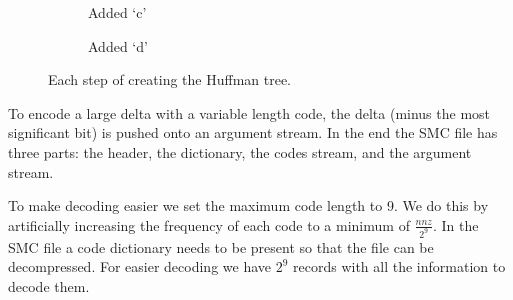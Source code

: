 \begin{figure}
\begin{subfigure}{.5\linewidth}
\begin{tikzpicture}
        \end{tikzpicture}
        \caption{Added `c'}
        \label{fig:Huffmantree3}
    \end{subfigure}
    \begin{subfigure}{.45\linewidth}
        \centering
        \caption{Added `d'}
        \label{fig:Huffmantree3}
    \end{subfigure}
    \caption[Huffman tree for sparse matrix compression.]{Each step of creating the Huffman tree.}
    \label{fig:huffman_tree}
\end{figure}

To encode a large delta with a variable length code, the delta (minus the most significant bit) is pushed onto an argument stream. In the end the SMC file has three parts: the header, the dictionary, the codes stream, and the argument stream.

To make decoding easier we set the maximum code length to 9. We do this by artificially increasing the frequency of each code to a minimum of $\frac{nnz}{2^9}$. In the SMC file a code dictionary needs to be present so that the file can be decompressed. For easier decoding we have $2^9$ records with all the information to decode them.

